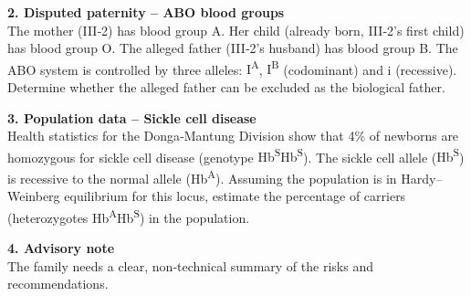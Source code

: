 \documentclass[11pt]{article}
\newcommand{\cle}[1]{{\popxbold\color{popdark}#1}}
\begin{document}
\textbf{2. Disputed paternity – ABO blood groups}\\
The mother (III‑2) has blood group A. Her child (already born, III‑2’s first child) has blood group O. The alleged father (III‑2’s husband) has blood group B. The ABO system is controlled by three alleles: \cle{I\textsuperscript{A}}, \cle{I\textsuperscript{B}} (codominant) and \cle{i} (recessive). Determine whether the alleged father can be excluded as the biological father.

\textbf{3. Population data – Sickle cell disease}\\
Health statistics for the Donga‑Mantung Division show that 4\% of newborns are homozygous for sickle cell disease (genotype \cle{Hb\textsuperscript{S}Hb\textsuperscript{S}}). The sickle cell allele (\cle{Hb\textsuperscript{S}}) is recessive to the normal allele (\cle{Hb\textsuperscript{A}}). Assuming the population is in Hardy–Weinberg equilibrium for this locus, estimate the percentage of carriers (heterozygotes \cle{Hb\textsuperscript{A}Hb\textsuperscript{S}}) in the population.

\textbf{4. Advisory note}\\
The family needs a clear, non‑technical summary of the risks and recommendations.
\end{document}
